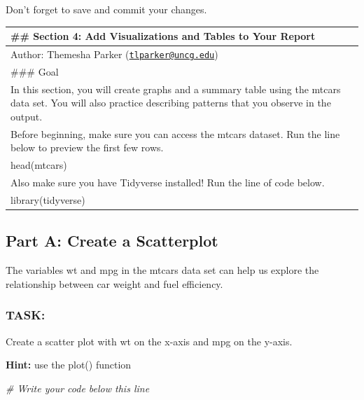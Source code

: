 \documentclass[
]{article}
\newenvironment{Shaded}{\begin{snugshade}}{\end{snugshade}}
\newcommand{\CommentTok}[1]{\textcolor[rgb]{0.56,0.35,0.01}{\textit{#1}}}
\begin{document}
Don't forget to save and commit your changes.

\begin{longtable}[]{@{}
  >{\raggedright\arraybackslash}p{}@{}}
\toprule\noalign{}
\begin{minipage}[b]{\linewidth}\raggedright
\#\# Section 4: Add Visualizations and Tables to Your Report
\end{minipage} \\
\midrule\noalign{}
\endhead
\bottomrule\noalign{}
\endlastfoot
Author: Themesha Parker
(\href{mailto:tlparker@uncg.edu}{\nolinkurl{tlparker@uncg.edu}}) \\
\#\#\# Goal \\
In this section, you will create graphs and a summary table using the
mtcars data set. You will also practice describing patterns that you
observe in the output. \\
Before beginning, make sure you can access the mtcars dataset. Run the
line below to preview the first few rows. \\
head(mtcars) \\
Also make sure you have Tidyverse installed! Run the line of code
below. \\
library(tidyverse) \\
\end{longtable}

\subsection{Part A: Create a
Scatterplot}\label{part-a-create-a-scatterplot}

The variables wt and mpg in the mtcars data set can help us explore the
relationship between car weight and fuel efficiency.

\subsubsection{TASK:}\label{task}

Create a scatter plot with wt on the x-axis and mpg on the y-axis.

\textbf{Hint:} use the plot() function

\begin{Shaded}
\begin{Highlighting}[]
\CommentTok{\# Write your code below this line}
\end{Highlighting}
\end{Shaded}
\end{document}
